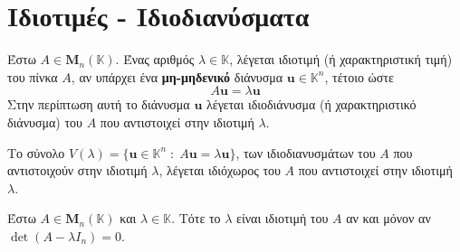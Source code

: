 






\chapter*{Ιδιοτιμές - Ιδιοδιανύσματα}

\begin{dfn}
  Έστω $ A \in \textbf{M}_{n}(\mathbb{K}) $. Ένας αριθμός $ \lambda \in \mathbb{K} $, 
  λέγεται \textcolor{Col1}{ιδιοτιμή} (ή χαρακτηριστική τιμή) του πίνκα $A$, 
  αν υπάρχει ένα \textbf{μη-μηδενικό} διάνυσμα $ \mathbf{u} \in \mathbb{K}^{n} $, 
  τέτοιο ώστε 
  \[
    A \mathbf{u} = \lambda \mathbf{u}  
  \] 
  Στην περίπτωση αυτή το διάνυσμα $ \mathbf{u} $ λέγεται \textcolor{Col1}{ιδιοδιάνυσμα} 
  (ή χαρακτηριστικό διάνυσμα) του $A$ που αντιστοιχεί στην ιδιοτιμή $\lambda$.
\end{dfn}

\begin{dfn}
  Το σύνολο $ V(\lambda) = \{ \mathbf{u} \in \mathbb{K}^{n} \; : \; A \mathbf{u}= \lambda
  \mathbf{u} \} $, των ιδιοδιανυσμάτων του $A$ που αντιστοιχούν στην ιδιοτιμή 
  $\lambda$, λέγεται \textcolor{Col1}{ιδιόχωρος} του $A$ που αντιστοιχεί στην ιδιοτιμή 
  $ \lambda $. 
\end{dfn}

\begin{thm}\label{thm:char}
  Έστω $ A \in \textbf{M}_{n}(\mathbb{K}) $ και $ \lambda \in \mathbb{K} $. Τότε το 
  $ \lambda $ είναι ιδιοτιμή του $A$ αν και μόνον αν $ \det(A- \lambda I_{n}) = 0 $.
\end{thm}

